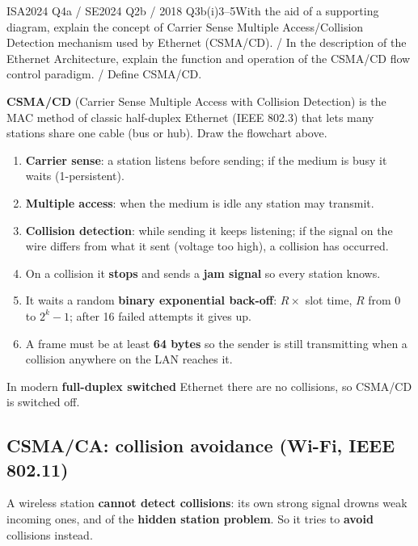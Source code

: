 \documentclass[10pt]{article}
\begin{document}
\begin{pastq}{ISA2024 Q4a \textnormal{/} SE2024 Q2b \textnormal{/} 2018 Q3b(i)}{3--5}With the aid of a supporting diagram, explain the concept of Carrier Sense Multiple Access/Collision Detection mechanism used by Ethernet (CSMA/CD). / In the description of the Ethernet Architecture, explain the function and operation of the CSMA/CD flow control paradigm. / Define CSMA/CD.\end{pastq}
\begin{ans}
\textbf{CSMA/CD} (Carrier Sense Multiple Access with Collision Detection) is the MAC method of classic half-duplex Ethernet (IEEE 802.3) that lets many stations share one cable (bus or hub). Draw the flowchart above.
\begin{enumerate}
\item \textbf{Carrier sense}: a station listens before sending; if the medium is busy it waits (1-persistent).
\item \textbf{Multiple access}: when the medium is idle any station may transmit.
\item \textbf{Collision detection}: while sending it keeps listening; if the signal on the wire differs from what it sent (voltage too high), a collision has occurred.
\item On a collision it \textbf{stops} and sends a \textbf{jam signal} so every station knows.
\item It waits a random \textbf{binary exponential back-off}: $R \times$ slot time, $R$ from 0 to $2^k-1$; after 16 failed attempts it gives up.
\item A frame must be at least \textbf{64 bytes} so the sender is still transmitting when a collision anywhere on the LAN reaches it.
\end{enumerate}
In modern \textbf{full-duplex switched} Ethernet there are no collisions, so CSMA/CD is switched off.
\end{ans}

\subsection{CSMA/CA: collision avoidance (Wi-Fi, IEEE 802.11)}
A wireless station \textbf{cannot detect collisions}: its own strong signal drowns weak incoming ones, and of the \textbf{hidden station problem}. So it tries to \textbf{avoid} collisions instead.
\end{document}
